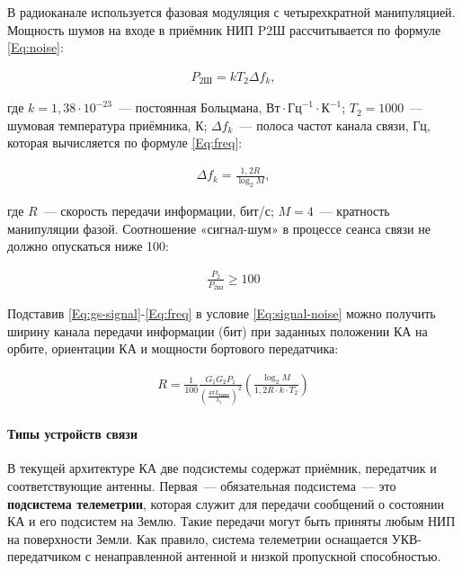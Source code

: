 \documentclass[12pt,a4paper]{article}
\begin{document}
В радиоканале используется фазовая модуляция с четырехкратной манипуляцией. Мощность шумов
на входе в приёмник НИП P2Ш рассчитывается по формуле \ref{Eq:noise}:

\begin{eqnarray}
P_{2\text{Ш}} = k T_2 \Delta f_k, \label{Eq:noise}
\end{eqnarray}

где $k = 1,38 \cdot 10^{-23}$~--- постоянная Больцмана, $\text{Вт} \cdot \text{Гц}^{-1}
\cdot \text{К}^{-1}$; $T_2 = 1000$~--- шумовая температура приёмника, К; $\Delta f_k$~--- полоса
частот канала связи, Гц, которая вычисляется по формуле \ref{Eq:freq}:

\begin{eqnarray}
\Delta f_k = \frac{1,2 R}{\log_2{M}}, \label{Eq:freq}
\end{eqnarray}

где $R$~--– скорость передачи информации, бит/с; $M = 4$~--– кратность манипуляции фазой.
Соотношение «сигнал-шум» в процессе сеанса связи не должно опускаться ниже 100:

\begin{eqnarray}
\frac{P_{2}}{P_{2\text{Ш}}} \geqslant 100 \label{Eq:signal-noise}
\end{eqnarray}

Подставив \ref{Eq:gs-signal}-\ref{Eq:freq} в условие \ref{Eq:signal-noise} можно получить
ширину канала передачи информации (бит) при заданных положении КА на орбите, ориентации КА
и мощности бортового передатчика:

\begin{eqnarray}
R = \frac{1}{100} \frac{G_1 G_2 P_1}{\left( \frac{4 \pi L_{\text{НИП}}}{\lambda_1}
  \right)^2} \left( \frac{\log_2{M}}{1,2 R \cdot k \cdot T_2} \right)
\end{eqnarray}

\paragraph{Типы устройств связи}

В текущей архитектуре КА две подсистемы содержат приёмник, передатчик и соответствующие
антенны. Первая~--- обязательная подсистема~--- это \textbf{подсистема телеметрии},
которая служит для передачи сообщений о состоянии КА и его подсистем на Землю. Такие
передачи могут быть приняты любым НИП на поверхности Земли. Как правило, система
телеметрии оснащается УКВ-передатчиком с ненаправленной антенной и низкой пропускной
способностью.
\end{document}
